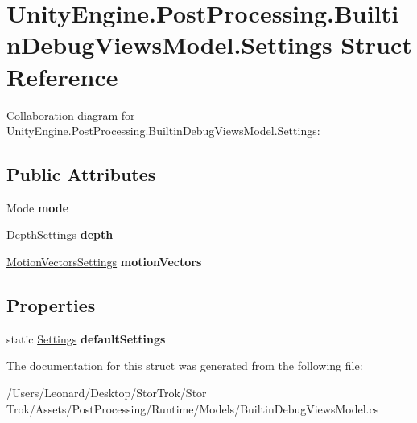 \hypertarget{struct_unity_engine_1_1_post_processing_1_1_builtin_debug_views_model_1_1_settings}{}\section{Unity\+Engine.\+Post\+Processing.\+Builtin\+Debug\+Views\+Model.\+Settings Struct Reference}
\label{struct_unity_engine_1_1_post_processing_1_1_builtin_debug_views_model_1_1_settings}


Collaboration diagram for Unity\+Engine.\+Post\+Processing.\+Builtin\+Debug\+Views\+Model.\+Settings\+:
\subsection*{Public Attributes}
\begin{DoxyCompactItemize}
\item 
\mbox{\label{struct_unity_engine_1_1_post_processing_1_1_builtin_debug_views_model_1_1_settings_a64bfde9afcab454ff4cae8093cbfc961}} 
Mode {\bfseries mode}
\item 
\mbox{\label{struct_unity_engine_1_1_post_processing_1_1_builtin_debug_views_model_1_1_settings_a7283a05c8d37043a2643d573943f20b7}} 
\hyperlink{struct_unity_engine_1_1_post_processing_1_1_builtin_debug_views_model_1_1_depth_settings}{Depth\+Settings} {\bfseries depth}
\item 
\mbox{\label{struct_unity_engine_1_1_post_processing_1_1_builtin_debug_views_model_1_1_settings_ae87a46433175c77452522ba4c1bc855b}} 
\hyperlink{struct_unity_engine_1_1_post_processing_1_1_builtin_debug_views_model_1_1_motion_vectors_settings}{Motion\+Vectors\+Settings} {\bfseries motion\+Vectors}
\end{DoxyCompactItemize}
\subsection*{Properties}
\begin{DoxyCompactItemize}
\item 
\mbox{\label{struct_unity_engine_1_1_post_processing_1_1_builtin_debug_views_model_1_1_settings_a3f6924d1e6965becf46634057007e552}} 
static \hyperlink{struct_unity_engine_1_1_post_processing_1_1_builtin_debug_views_model_1_1_settings}{Settings} {\bfseries default\+Settings}
\end{DoxyCompactItemize}


The documentation for this struct was generated from the following file\+:\begin{DoxyCompactItemize}
\item 
/\+Users/\+Leonard/\+Desktop/\+Stor\+Trok/\+Stor Trok/\+Assets/\+Post\+Processing/\+Runtime/\+Models/Builtin\+Debug\+Views\+Model.\+cs\end{DoxyCompactItemize}
